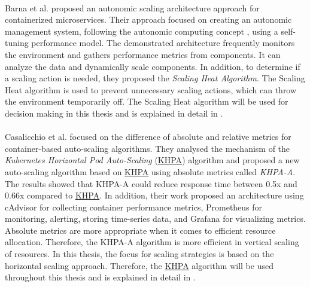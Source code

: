 \paragraph{}Barna et al. \cite{Barna2017ElasticContainerApps} proposed an autonomic scaling architecture approach for containerized microservices. Their approach focused on creating an autonomic management system, following the autonomic computing concept \cite{Kephart2003VisionComputing}, using a self-tuning performance model. The demonstrated architecture frequently monitors the environment and gathers performance metrics from components. It can analyze the data and dynamically scale components. In addition, to determine if a scaling action is needed, they proposed the \textit{Scaling Heat Algorithm}. The Scaling Heat algorithm is used to prevent unnecessary scaling actions, which can throw the environment temporarily off.
The Scaling Heat algorithm will be used for decision making in this thesis and is explained in detail in .


\paragraph{}Casalicchio et al. \cite{Casalicchio2017AutoScaleCont} focused on the difference of absolute and relative metrics for container-based auto-scaling algorithms. They analysed the mechanism of the \textit{Kubernetes Horizontal Pod Auto-Scaling} (\hyperlink{abbr:khpa}{KHPA}) algorithm and proposed a new auto-scaling algorithm based on \hyperlink{abbr:khpa}{KHPA} using absolute metrics called \textit{KHPA-A}. The results showed that KHPA-A could reduce response time between 0.5x and 0.66x compared to \hyperlink{abbr:khpa}{KHPA}. In addition, their work proposed an architecture using cAdvisor for collecting container performance metrics, Prometheus for monitoring, alerting, storing time-series data, and Grafana for visualizing metrics. 
Absolute metrics are more appropriate when it comes to efficient resource allocation. Therefore, the KHPA-A algorithm is more efficient in vertical scaling of resources.
In this thesis, the focus for scaling strategies is based on the horizontal scaling approach. Therefore, the \hyperlink{abbr:khpa}{KHPA} algorithm will be used throughout this thesis and is explained in detail in .


